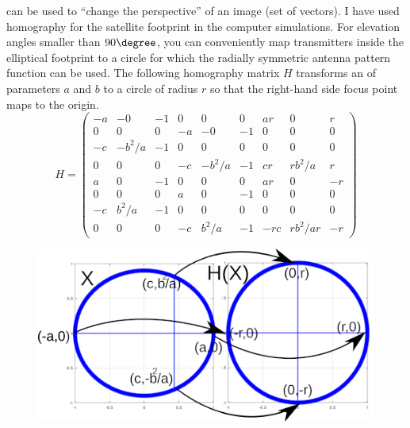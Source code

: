 \documentclass{article}
\begin{document}
 can be used to ``change the perspective'' of an image (set of vectors). I have used homography for the satellite footprint in the computer simulations. For elevation angles smaller than $90 \degree$, you can conveniently map transmitters inside the elliptical footprint to a circle for which the radially symmetric antenna pattern function can be used. The following homography matrix $H$ transforms an  of parameters $a$ and $b$ to a circle of radius $r$ so that the right-hand side focus point maps to the origin.
$$
H=
\begin{pmatrix}
  -a &-0 &-1 &0 &0 &0 &ar &0 &r \\
  0 &0 &0 &-a &-0 &-1 & 0& 0 &0 \\
  -c &-b^2/a& -1& 0& 0& 0 &0& 0& 0 \\
  0 &0 &0 &-c &-b^2/a &-1 &cr &rb^2/a& r\\
  a &0 &-1& 0& 0 &0 & ar &0 &-r \\
  0 &0 &0 &a &0 &-1 &0 &0 &0\\
  -c &b^2/a& -1& 0& 0& 0& 0& 0& 0 \\
  0 &0 &0 &-c &b^2/a &-1 &-rc &rb^2/ar &-r 
\end{pmatrix}
$$

\begin{figure}
  \includegraphics[width=\linewidth]{homographydrawing.png}
\end{figure}
\end{document}
